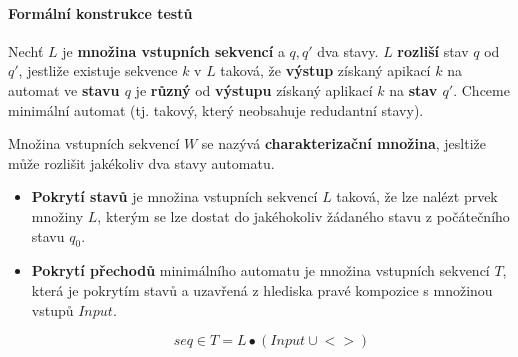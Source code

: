 \paragraph{Formální konstrukce testů}

Nechť $L$ je \textbf{množina vstupních sekvencí} a $q, q'$ dva stavy. $L$ \textbf{rozliší} stav $q$ od $q'$, jestliže existuje sekvence $k$ v $L$ taková, že \textbf{výstup} získaný apikací $k$ na automat ve \textbf{stavu $q$} je \textbf{různý} od \textbf{výstupu} získaný aplikací $k$ na \textbf{stav $q'$}. Chceme minimální automat (tj. takový, který neobsahuje redudantní stavy).

Množina vstupních sekvencí $W$ se nazývá \textbf{charakterizační množina}, jesltiže může rozlišit jakékoliv dva stavy automatu.

\begin{itemize}
\item \textbf{Pokrytí stavů} je množina vstupních sekvencí $L$ taková, že lze nalézt prvek množiny $L$, kterým se lze dostat do jakéhokoliv žádaného stavu z počátečního stavu $q_0$.
\item \textbf{Pokrytí přechodů} minimálního automatu je množina vstupních sekvencí $T$, která je pokrytím stavů a uzavřená z hlediska pravé kompozice s množinou vstupů $Input$.

$$seq \in T = L \bullet (Input \cup {<>})$$

\end{itemize}
